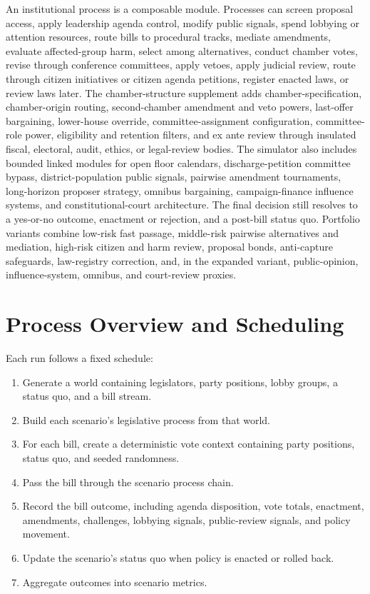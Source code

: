 \documentclass[manuscript]{acmart}
\begin{document}
An institutional process is a composable module. Processes can screen proposal access, apply leadership agenda control, modify public signals, spend lobbying or attention resources, route bills to procedural tracks, mediate amendments, evaluate affected-group harm, select among alternatives, conduct chamber votes, revise through conference committees, apply vetoes, apply judicial review, route through citizen initiatives or citizen agenda petitions, register enacted laws, or review laws later. The chamber-structure supplement adds chamber-specification, chamber-origin routing, second-chamber amendment and veto powers, last-offer bargaining, lower-house override, committee-assignment configuration, committee-role power, eligibility and retention filters, and ex ante review through insulated fiscal, electoral, audit, ethics, or legal-review bodies. The simulator also includes bounded linked modules for open floor calendars, discharge-petition committee bypass, district-population public signals, pairwise amendment tournaments, long-horizon proposer strategy, omnibus bargaining, campaign-finance influence systems, and constitutional-court architecture. The final decision still resolves to a yes-or-no outcome, enactment or rejection, and a post-bill status quo. Portfolio variants combine low-risk fast passage, middle-risk pairwise alternatives and mediation, high-risk citizen and harm review, proposal bonds, anti-capture safeguards, law-registry correction, and, in the expanded variant, public-opinion, influence-system, omnibus, and court-review proxies.

\section{Process Overview and Scheduling}

Each run follows a fixed schedule:

\begin{enumerate}
  \item Generate a world containing legislators, party positions, lobby groups, a status quo, and a bill stream.
  \item Build each scenario's legislative process from that world.
  \item For each bill, create a deterministic vote context containing party positions, status quo, and seeded randomness.
  \item Pass the bill through the scenario process chain.
  \item Record the bill outcome, including agenda disposition, vote totals, enactment, amendments, challenges, lobbying signals, public-review signals, and policy movement.
  \item Update the scenario's status quo when policy is enacted or rolled back.
  \item Aggregate outcomes into scenario metrics.
\end{enumerate}
\end{document}
